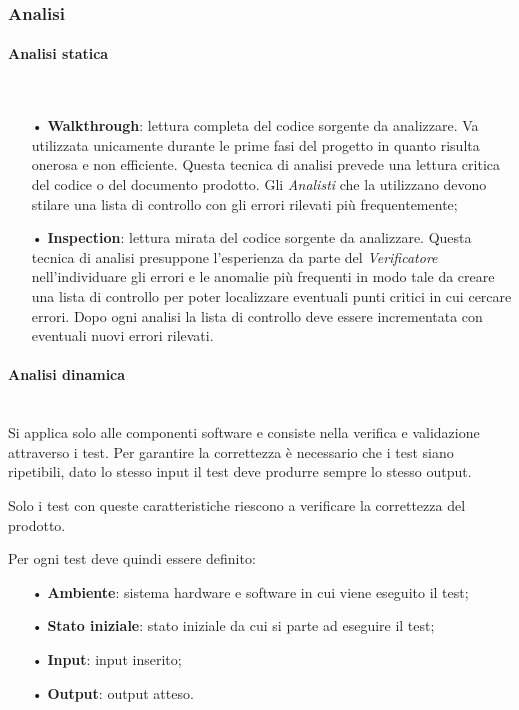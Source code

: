 {\subsubsection{Analisi}


\paragraph{Analisi statica}\mbox{}\\
\begin{itemize}
\item[•] \textbf{Walkthrough}: lettura completa del codice sorgente da analizzare. Va utilizzata unicamente durante le prime fasi del progetto in quanto risulta onerosa e non efficiente. Questa tecnica di analisi prevede una lettura critica del codice o del documento prodotto. Gli \textit{Analisti} che la utilizzano devono stilare una lista di controllo con gli errori rilevati più frequentemente;
\item[•] \textbf{Inspection}: lettura mirata del codice sorgente da analizzare. Questa tecnica di analisi presuppone l’esperienza da parte del \textit{Verificatore} nell’individuare gli errori e le anomalie più frequenti in modo tale da creare una lista di controllo per poter localizzare eventuali punti critici in cui cercare errori. Dopo ogni analisi la lista di controllo deve essere incrementata con eventuali nuovi errori rilevati.
\end{itemize}

\paragraph{Analisi dinamica}\mbox{}\\
Si applica solo alle componenti software e consiste nella verifica e validazione attraverso i test. Per garantire la correttezza è necessario che i test siano ripetibili, dato lo stesso input il test deve produrre sempre lo stesso output.  

Solo i test con queste caratteristiche riescono a verificare la correttezza del prodotto.

Per ogni test deve quindi essere definito: 
\begin{itemize}
\item[•] \textbf{Ambiente}: sistema hardware e software in cui viene eseguito il test; 
\item[•]\textbf{Stato iniziale}: stato iniziale da cui si parte ad eseguire il test; 
\item[•] \textbf{Input}: input inserito;
\item[•] \textbf{Output}: output atteso.
\end{itemize}

}
